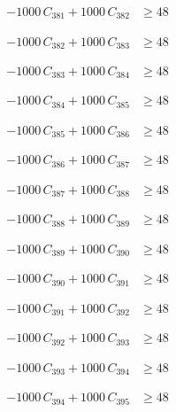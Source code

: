 \documentclass[a4paper,11pt]{article}
\begin{document}
\begin{align}
-1000\,C_{381} + 1000\,C_{382} &\geq 48 \nonumber
\end{align}

\begin{align}
-1000\,C_{382} + 1000\,C_{383} &\geq 48 \nonumber
\end{align}

\begin{align}
-1000\,C_{383} + 1000\,C_{384} &\geq 48 \nonumber
\end{align}

\begin{align}
-1000\,C_{384} + 1000\,C_{385} &\geq 48 \nonumber
\end{align}

\begin{align}
-1000\,C_{385} + 1000\,C_{386} &\geq 48 \nonumber
\end{align}

\begin{align}
-1000\,C_{386} + 1000\,C_{387} &\geq 48 \nonumber
\end{align}

\begin{align}
-1000\,C_{387} + 1000\,C_{388} &\geq 48 \nonumber
\end{align}

\begin{align}
-1000\,C_{388} + 1000\,C_{389} &\geq 48 \nonumber
\end{align}

\begin{align}
-1000\,C_{389} + 1000\,C_{390} &\geq 48 \nonumber
\end{align}

\begin{align}
-1000\,C_{390} + 1000\,C_{391} &\geq 48 \nonumber
\end{align}

\begin{align}
-1000\,C_{391} + 1000\,C_{392} &\geq 48 \nonumber
\end{align}

\begin{align}
-1000\,C_{392} + 1000\,C_{393} &\geq 48 \nonumber
\end{align}

\begin{align}
-1000\,C_{393} + 1000\,C_{394} &\geq 48 \nonumber
\end{align}

\begin{align}
-1000\,C_{394} + 1000\,C_{395} &\geq 48 \nonumber
\end{align}
\end{document}
